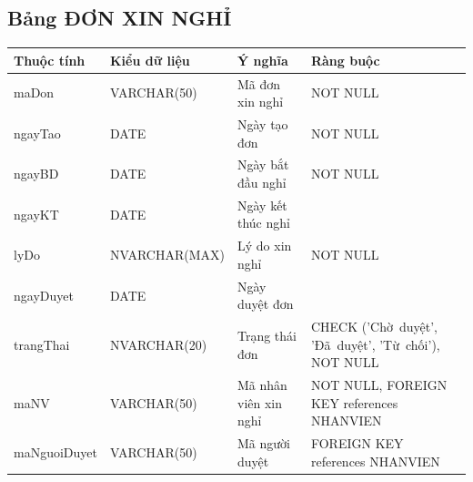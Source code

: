 \documentclass[a4paper,12pt]{report}
\begin{document}
\subsection{Bảng ĐƠN XIN NGHỈ}
\noindent
\begin{center}
    \begin{longtable}{|>{\centering\arraybackslash}p{3cm}|
        >{\centering\arraybackslash}p{4cm}|
        >{\centering\arraybackslash}p{4cm}|
        >{\centering\arraybackslash}p{4cm}|}
        \hline
        \textbf{Thuộc tính}                                                                                                               &
        \textbf{Kiểu dữ liệu}                                                                                                                             &
        \textbf{Ý nghĩa}                                                                                                 &
        \textbf{Ràng buộc}                                                                                                         \\
        \hline
        maDon &  VARCHAR(50)  & Mã đơn xin nghỉ & NOT NULL \\
        \hline
        ngayTao &  DATE  & Ngày tạo đơn & NOT NULL \\                                                                                                                          
        \hline
        ngayBD &  DATE  & Ngày bắt đầu nghỉ & NOT NULL \\                                                                                                                          
        \hline
        ngayKT &  DATE  & Ngày kết thúc nghỉ & \\                                                                                                                          
        \hline
        lyDo &  NVARCHAR(MAX)  & Lý do xin nghỉ & NOT NULL \\                                                                                                                          
        \hline
        ngayDuyet &  DATE  & Ngày duyệt đơn & \\                                                                                                                          
        \hline
        trangThai &  NVARCHAR(20)  & Trạng thái đơn & CHECK ('Chờ~duyệt', 'Đã~duyệt', 'Từ~chối'), NOT NULL \\
        \hline
        maNV &  VARCHAR(50)  & Mã nhân viên xin nghỉ & NOT NULL, FOREIGN KEY references NHANVIEN \\                                                                                                                          
        \hline
        maNguoiDuyet &  VARCHAR(50)  & Mã người duyệt & FOREIGN KEY references NHANVIEN \\                                                                                                                          
        \hline
    \end{longtable}
\end{center}
\end{document}
